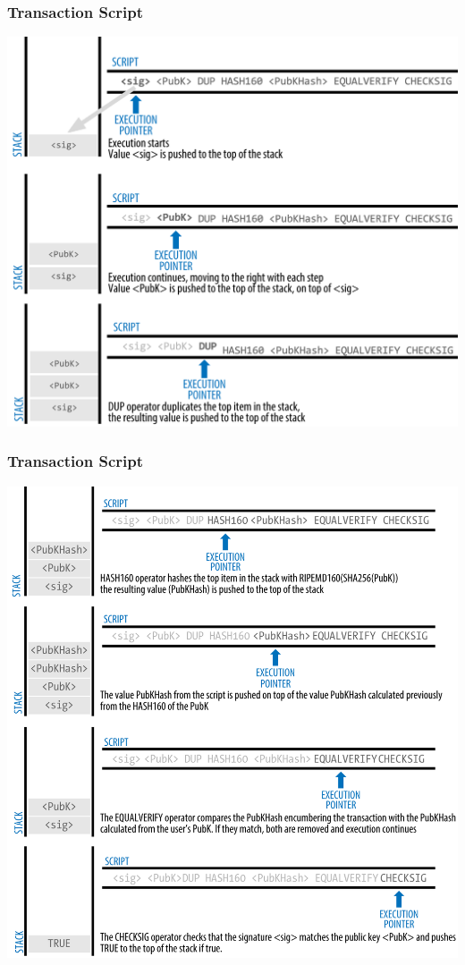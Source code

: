 \begin{frame}
    \frametitle{Transaction Script}
    \includegraphics[scale=0.55]{./figures/mbc2_0605.png}
\end{frame}

\begin{frame}
    \frametitle{Transaction Script}
    \includegraphics[scale=0.55]{./figures/mbc2_0606.png}
\end{frame}


